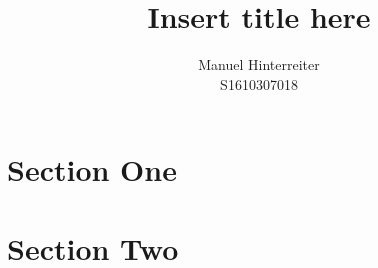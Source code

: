\documentclass[12pt]{article}
\title{Insert title here} %
\author{Manuel Hinterreiter\\S1610307018}
\begin{document}
\maketitle
\tableofcontents
\section{Section One}
\section{Section Two}
\end{document}

